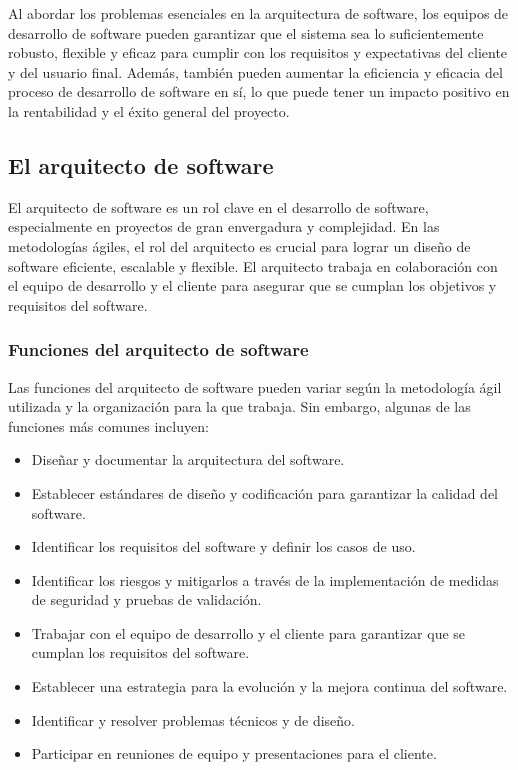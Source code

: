\documentclass[executivepaper]{article}
\begin{document}
Al abordar los problemas esenciales en la arquitectura de software, los equipos de desarrollo de software pueden garantizar que el sistema sea lo suficientemente robusto, flexible y eficaz para cumplir con los requisitos y expectativas del cliente y del usuario final. Además, también pueden aumentar la eficiencia y eficacia del proceso de desarrollo de software en sí, lo que puede tener un impacto positivo en la rentabilidad y el éxito general del proyecto.

\subsection{El arquitecto de software}
El arquitecto de software es un rol clave en el desarrollo de software, especialmente en proyectos de gran envergadura y complejidad. En las metodologías ágiles, el rol del arquitecto es crucial para lograr un diseño de software eficiente, escalable y flexible. El arquitecto trabaja en colaboración con el equipo de desarrollo y el cliente para asegurar que se cumplan los objetivos y requisitos del software.

\subsubsection*{Funciones del arquitecto de software}

Las funciones del arquitecto de software pueden variar según la metodología ágil utilizada y la organización para la que trabaja. Sin embargo, algunas de las funciones más comunes incluyen:

\begin{itemize}
\item Diseñar y documentar la arquitectura del software.
\item Establecer estándares de diseño y codificación para garantizar la calidad del software.
\item Identificar los requisitos del software y definir los casos de uso.
\item Identificar los riesgos y mitigarlos a través de la implementación de medidas de seguridad y pruebas de validación.
\item Trabajar con el equipo de desarrollo y el cliente para garantizar que se cumplan los requisitos del software.
\item Establecer una estrategia para la evolución y la mejora continua del software.
\item Identificar y resolver problemas técnicos y de diseño.
\item Participar en reuniones de equipo y presentaciones para el cliente.
\end{itemize}
\end{document}
